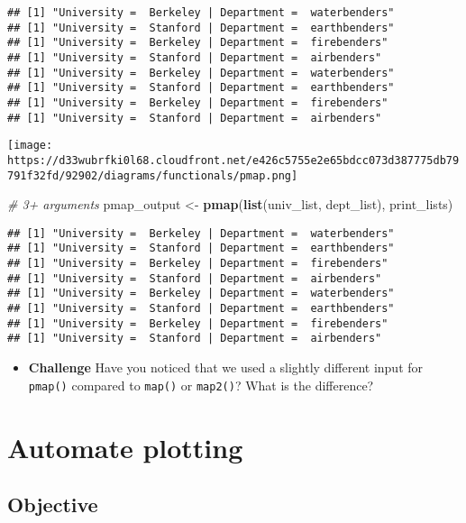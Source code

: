 \documentclass[
]{book}
\newenvironment{Shaded}{\begin{snugshade}}{\end{snugshade}}
\newcommand{\CommentTok}[1]{\textcolor[rgb]{0.56,0.35,0.01}{\textit{#1}}}
\newcommand{\KeywordTok}[1]{\textcolor[rgb]{0.13,0.29,0.53}{\textbf{#1}}}
\newcommand{\NormalTok}[1]{#1}
\newcommand{\StringTok}[1]{\textcolor[rgb]{0.31,0.60,0.02}{#1}}
\providecommand{\tightlist}{%
  \setlength{\itemsep}{0pt}\setlength{\parskip}{0pt}}
\begin{document}
\begin{verbatim}
## [1] "University =  Berkeley | Department =  waterbenders"
## [1] "University =  Stanford | Department =  earthbenders"
## [1] "University =  Berkeley | Department =  firebenders"
## [1] "University =  Stanford | Department =  airbenders"
## [1] "University =  Berkeley | Department =  waterbenders"
## [1] "University =  Stanford | Department =  earthbenders"
## [1] "University =  Berkeley | Department =  firebenders"
## [1] "University =  Stanford | Department =  airbenders"
\end{verbatim}

\texttt{[image: https://d33wubrfki0l68.cloudfront.net/e426c5755e2e65bdcc073d387775db79791f32fd/92902/diagrams/functionals/pmap.png]}

\begin{Shaded}
\begin{Highlighting}[]
\CommentTok{\# 3+ arguments}
\NormalTok{pmap\_output \textless{}{-}}\StringTok{ }\KeywordTok{pmap}\NormalTok{(}\KeywordTok{list}\NormalTok{(univ\_list, dept\_list), print\_lists)}
\end{Highlighting}
\end{Shaded}

\begin{verbatim}
## [1] "University =  Berkeley | Department =  waterbenders"
## [1] "University =  Stanford | Department =  earthbenders"
## [1] "University =  Berkeley | Department =  firebenders"
## [1] "University =  Stanford | Department =  airbenders"
## [1] "University =  Berkeley | Department =  waterbenders"
## [1] "University =  Stanford | Department =  earthbenders"
## [1] "University =  Berkeley | Department =  firebenders"
## [1] "University =  Stanford | Department =  airbenders"
\end{verbatim}

\begin{itemize}
\tightlist
\item
  \textbf{Challenge} Have you noticed that we used a slightly different input for \texttt{pmap()} compared to \texttt{map()} or \texttt{map2()}? What is the difference?
\end{itemize}

\hypertarget{glue}{%
\section{Automate plotting}\label{glue}}

\hypertarget{objective}{%
\subsection{Objective}\label{objective}}
\end{document}
